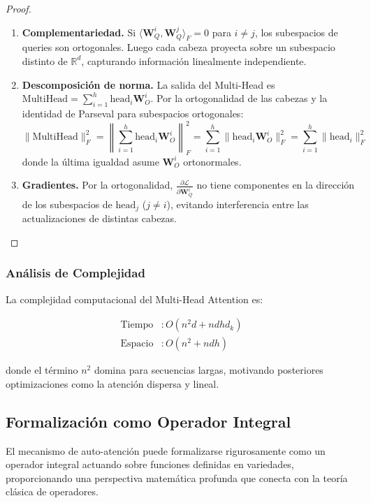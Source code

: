 \begin{proof}
\leavevmode
\begin{enumerate}
    \item \textbf{Complementariedad.} Si $\langle \mathbf{W}_Q^i, \mathbf{W}_Q^j \rangle_F = 0$ para $i \neq j$, los subespacios de queries son ortogonales. Luego cada cabeza proyecta sobre un subespacio distinto de $\mathbb{R}^d$, capturando información linealmente independiente.

    \item \textbf{Descomposición de norma.} La salida del Multi-Head es $\text{MultiHead} = \sum_{i=1}^h \text{head}_i \mathbf{W}_O^i$. Por la ortogonalidad de las cabezas y la identidad de Parseval para subespacios ortogonales:
    \[
    \|\text{MultiHead}\|_F^2 = \left\|\sum_{i=1}^h \text{head}_i \mathbf{W}_O^i\right\|_F^2 = \sum_{i=1}^h \|\text{head}_i \mathbf{W}_O^i\|_F^2 = \sum_{i=1}^h \|\text{head}_i\|_F^2
    \]
    donde la última igualdad asume $\mathbf{W}_O^i$ ortonormales.

    \item \textbf{Gradientes.} Por la ortogonalidad, $\frac{\partial \mathcal{L}}{\partial \mathbf{W}_Q^i}$ no tiene componentes en la dirección de los subespacios de $\text{head}_j$ ($j \neq i$), evitando interferencia entre las actualizaciones de distintas cabezas. \qedhere
\end{enumerate}
\end{proof}

\subsubsection{Análisis de Complejidad}

La complejidad computacional del Multi-Head Attention es:

\begin{align}
    \text{Tiempo} &: O(n^2 d + ndhd_k) \\
    \text{Espacio} &: O(n^2 + ndh)
\end{align}

donde el término $n^2$ domina para secuencias largas, motivando posteriores optimizaciones como la atención dispersa y lineal.

\subsection{Formalización como Operador Integral}\label{subsec:attention_integral_operator}

El mecanismo de auto-atención puede formalizarse rigurosamente como un operador integral actuando sobre funciones definidas en variedades, proporcionando una perspectiva matemática profunda que conecta con la teoría clásica de operadores.

